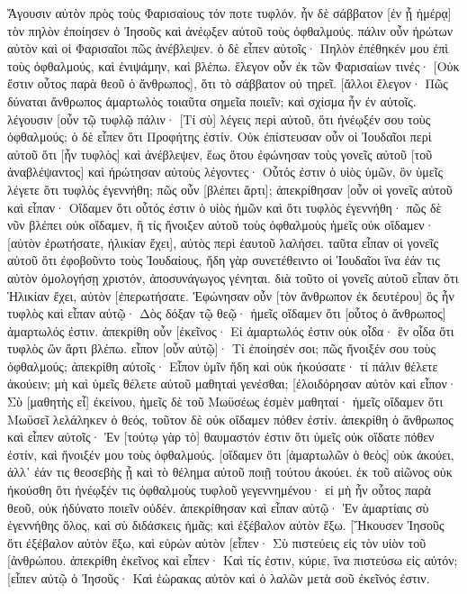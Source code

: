 Ἄγουσιν αὐτὸν πρὸς τοὺς Φαρισαίους τόν ποτε τυφλόν. 
ἦν δὲ σάββατον [ἐν ᾗ ἡμέρᾳ] τὸν πηλὸν ἐποίησεν ὁ Ἰησοῦς καὶ ἀνέῳξεν αὐτοῦ τοὺς ὀφθαλμούς. 
πάλιν οὖν ἠρώτων αὐτὸν καὶ οἱ Φαρισαῖοι πῶς ἀνέβλεψεν. ὁ δὲ εἶπεν αὐτοῖς· Πηλὸν ἐπέθηκέν μου ἐπὶ τοὺς ὀφθαλμούς, καὶ ἐνιψάμην, καὶ βλέπω. 
ἔλεγον οὖν ἐκ τῶν Φαρισαίων τινές· [Οὐκ ἔστιν οὗτος παρὰ θεοῦ ὁ ἄνθρωπος], ὅτι τὸ σάββατον οὐ τηρεῖ. [ἄλλοι ἔλεγον· Πῶς δύναται ἄνθρωπος ἁμαρτωλὸς τοιαῦτα σημεῖα ποιεῖν; καὶ σχίσμα ἦν ἐν αὐτοῖς. 
λέγουσιν [οὖν τῷ τυφλῷ πάλιν· [Τί σὺ] λέγεις περὶ αὐτοῦ, ὅτι ἠνέῳξέν σου τοὺς ὀφθαλμούς; ὁ δὲ εἶπεν ὅτι Προφήτης ἐστίν. 
Οὐκ ἐπίστευσαν οὖν οἱ Ἰουδαῖοι περὶ αὐτοῦ ὅτι [ἦν τυφλὸς] καὶ ἀνέβλεψεν, ἕως ὅτου ἐφώνησαν τοὺς γονεῖς αὐτοῦ [τοῦ ἀναβλέψαντος] 
καὶ ἠρώτησαν αὐτοὺς λέγοντες· Οὗτός ἐστιν ὁ υἱὸς ὑμῶν, ὃν ὑμεῖς λέγετε ὅτι τυφλὸς ἐγεννήθη; πῶς οὖν [βλέπει ἄρτι]; 
ἀπεκρίθησαν [οὖν οἱ γονεῖς αὐτοῦ καὶ εἶπαν· Οἴδαμεν ὅτι οὗτός ἐστιν ὁ υἱὸς ἡμῶν καὶ ὅτι τυφλὸς ἐγεννήθη· 
πῶς δὲ νῦν βλέπει οὐκ οἴδαμεν, ἢ τίς ἤνοιξεν αὐτοῦ τοὺς ὀφθαλμοὺς ἡμεῖς οὐκ οἴδαμεν· [αὐτὸν ἐρωτήσατε, ἡλικίαν ἔχει], αὐτὸς περὶ ἑαυτοῦ λαλήσει. 
ταῦτα εἶπαν οἱ γονεῖς αὐτοῦ ὅτι ἐφοβοῦντο τοὺς Ἰουδαίους, ἤδη γὰρ συνετέθειντο οἱ Ἰουδαῖοι ἵνα ἐάν τις αὐτὸν ὁμολογήσῃ χριστόν, ἀποσυνάγωγος γένηται. 
διὰ τοῦτο οἱ γονεῖς αὐτοῦ εἶπαν ὅτι Ἡλικίαν ἔχει, αὐτὸν [ἐπερωτήσατε. 
Ἐφώνησαν οὖν [τὸν ἄνθρωπον ἐκ δευτέρου] ὃς ἦν τυφλὸς καὶ εἶπαν αὐτῷ· Δὸς δόξαν τῷ θεῷ· ἡμεῖς οἴδαμεν ὅτι [οὗτος ὁ ἄνθρωπος] ἁμαρτωλός ἐστιν. 
ἀπεκρίθη οὖν [ἐκεῖνος· Εἰ ἁμαρτωλός ἐστιν οὐκ οἶδα· ἓν οἶδα ὅτι τυφλὸς ὢν ἄρτι βλέπω. 
εἶπον [οὖν αὐτῷ]· Τί ἐποίησέν σοι; πῶς ἤνοιξέν σου τοὺς ὀφθαλμούς; 
ἀπεκρίθη αὐτοῖς· Εἶπον ὑμῖν ἤδη καὶ οὐκ ἠκούσατε· τί πάλιν θέλετε ἀκούειν; μὴ καὶ ὑμεῖς θέλετε αὐτοῦ μαθηταὶ γενέσθαι; 
[ἐλοιδόρησαν αὐτὸν καὶ εἶπον· Σὺ [μαθητὴς εἶ] ἐκείνου, ἡμεῖς δὲ τοῦ Μωϋσέως ἐσμὲν μαθηταί· 
ἡμεῖς οἴδαμεν ὅτι Μωϋσεῖ λελάληκεν ὁ θεός, τοῦτον δὲ οὐκ οἴδαμεν πόθεν ἐστίν. 
ἀπεκρίθη ὁ ἄνθρωπος καὶ εἶπεν αὐτοῖς· Ἐν [τούτῳ γὰρ τὸ] θαυμαστόν ἐστιν ὅτι ὑμεῖς οὐκ οἴδατε πόθεν ἐστίν, καὶ ἤνοιξέν μου τοὺς ὀφθαλμούς. 
[οἴδαμεν ὅτι [ἁμαρτωλῶν ὁ θεὸς] οὐκ ἀκούει, ἀλλ᾽ ἐάν τις θεοσεβὴς ᾖ καὶ τὸ θέλημα αὐτοῦ ποιῇ τούτου ἀκούει. 
ἐκ τοῦ αἰῶνος οὐκ ἠκούσθη ὅτι ἠνέῳξέν τις ὀφθαλμοὺς τυφλοῦ γεγεννημένου· 
εἰ μὴ ἦν οὗτος παρὰ θεοῦ, οὐκ ἠδύνατο ποιεῖν οὐδέν. 
ἀπεκρίθησαν καὶ εἶπαν αὐτῷ· Ἐν ἁμαρτίαις σὺ ἐγεννήθης ὅλος, καὶ σὺ διδάσκεις ἡμᾶς; καὶ ἐξέβαλον αὐτὸν ἔξω. 
[Ἤκουσεν Ἰησοῦς ὅτι ἐξέβαλον αὐτὸν ἔξω, καὶ εὑρὼν αὐτὸν [εἶπεν· Σὺ πιστεύεις εἰς τὸν υἱὸν τοῦ [ἀνθρώπου. 
ἀπεκρίθη ἐκεῖνος καὶ εἶπεν· Καὶ τίς ἐστιν, κύριε, ἵνα πιστεύσω εἰς αὐτόν; 
[εἶπεν αὐτῷ ὁ Ἰησοῦς· Καὶ ἑώρακας αὐτὸν καὶ ὁ λαλῶν μετὰ σοῦ ἐκεῖνός ἐστιν. 
